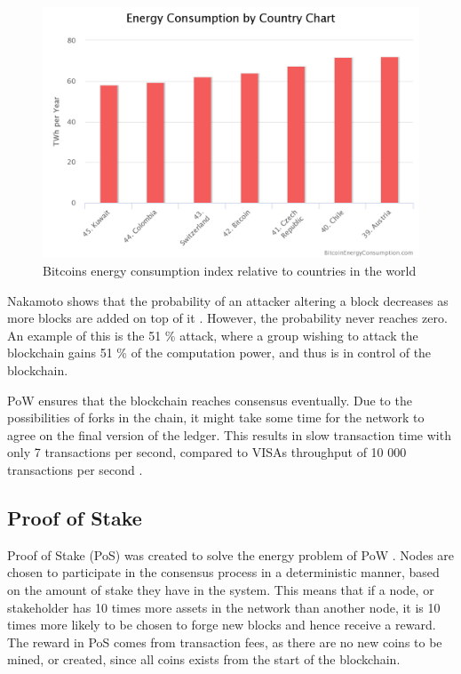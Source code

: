 \begin{figure}[ht]
    \centering
    \includegraphics[width=1\textwidth]{Images/bitcoin_energy}
    \caption{Bitcoins energy consumption index relative to countries in the world \cite{bitcoin_energy}}
    \label{fig:bitcoin_energy}
\end{figure}


Nakamoto shows that the probability of an attacker altering a block decreases as more blocks are added on top of it \cite{Nakamoto_bitcoin}. However, the probability never reaches zero. An example of this is the 51 \% attack, where a group wishing to attack the blockchain gains 51 \% of the computation power, and thus is in control of the blockchain. 

PoW ensures that the blockchain reaches consensus eventually. Due to the possibilities of forks in the chain, it might take some time for the network to agree on the final version of the ledger. This results in slow transaction time with only 7 transactions per second, compared to VISAs throughput of 10 000 transactions per second \cite{understanding_consensus}. 

\subsection{Proof of Stake}
Proof of Stake (PoS) was created to solve the energy problem of PoW \cite{understanding_consensus, Zheng_overview}. Nodes are chosen to participate in the consensus process in a deterministic manner, based on the amount of stake they have in the system. This means that if a node, or stakeholder has 10 times more assets in the network than another node, it is 10 times more likely \cite{ethereum_wiki} to be chosen to forge new blocks and hence receive a reward. The reward in PoS comes from transaction fees, as there are no new coins to be mined, or created, since all coins exists from the start of the blockchain. 

